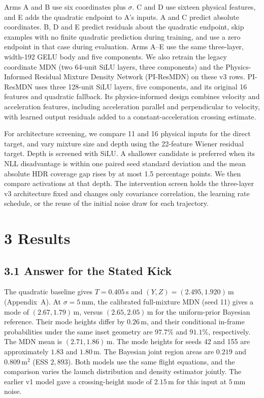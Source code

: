 Arms A and B use six coordinates plus $\sigma$. C and D use sixteen physical features, and E adds the quadratic endpoint to A's inputs. A and C predict absolute coordinates. B, D and E predict residuals about the quadratic endpoint, skip examples with no finite quadratic prediction during training, and use a zero endpoint in that case during evaluation. Arms A--E use the same three-layer, width-192 GELU body and five components. We also retrain the legacy coordinate MDN (two 64-unit SiLU layers, three components) and the Physics-Informed Residual Mixture Density Network (PI-ResMDN) on these v3 rows. PI-ResMDN uses three 128-unit SiLU layers, five components, and its original 16 features and quadratic fallback. Its physics-informed design combines velocity and acceleration features, including acceleration parallel and perpendicular to velocity, with learned output residuals added to a constant-acceleration crossing estimate.

For architecture screening, we compare 11 and 16 physical inputs for the direct target, and vary mixture size and depth using the 22-feature Wiener residual target. Depth is screened with SiLU. A shallower candidate is preferred when its NLL disadvantage is within one paired seed standard deviation and the mean absolute HDR coverage gap rises by at most 1.5 percentage points. We then compare activations at that depth. The intervention screen holds the three-layer v3 architecture fixed and changes only covariance correlation, the learning rate schedule, or the reuse of the initial noise draw for each trajectory.

\section{3 Results}

\subsection{3.1 Answer for the Stated Kick}

The quadratic baseline gives $T=0.405\,\mathrm{s}$ and $(Y,Z)=(2.495,1.920)\,\mathrm{m}$ (Appendix~A). At $\sigma=5\,\mathrm{mm}$, the calibrated full-mixture MDN (seed 11) gives a mode of $(2.67,1.79)\,\mathrm{m}$, versus $(2.65,2.05)\,\mathrm{m}$ for the uniform-prior Bayesian reference. Their mode heights differ by $0.26\,\mathrm{m}$, and their conditional in-frame probabilities under the same inset geometry are $97.7\%$ and $91.1\%$, respectively. The MDN mean is $(2.71,1.86)\,\mathrm{m}$. The mode heights for seeds 42 and 155 are approximately $1.83$ and $1.80\,\mathrm{m}$. The Bayesian joint region areas are $0.219$ and $0.809\,\mathrm{m^2}$ (ESS $2{,}893$). Both models use the same flight equations, and the comparison varies the launch distribution and density estimator jointly. The earlier v1 model gave a crossing-height mode of $2.15\,\mathrm{m}$ for this input at $5\,\mathrm{mm}$ noise.

